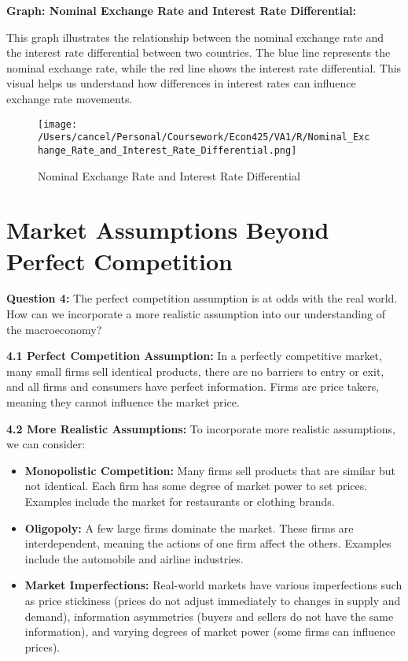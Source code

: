 \documentclass{article}
\begin{document}
\textbf{Graph: Nominal Exchange Rate and Interest Rate Differential:} 

This graph illustrates the relationship between the nominal exchange rate and the interest rate differential between two countries. The blue line represents the nominal exchange rate, while the red line shows the interest rate differential. This visual helps us understand how differences in interest rates can influence exchange rate movements.

\begin{figure}[h!]
    \centering
    \texttt{[image: /Users/cancel/Personal/Coursework/Econ425/VA1/R/Nominal\_Exchange\_Rate\_and\_Interest\_Rate\_Differential.png]}
    \caption{Nominal Exchange Rate and Interest Rate Differential}
\end{figure}

\hrulefill

\section{Market Assumptions Beyond Perfect Competition}

\textbf{Question 4:} The perfect competition assumption is at odds with the real world. How can we incorporate a more realistic assumption into our understanding of the macroeconomy?

\textbf{4.1 Perfect Competition Assumption:} In a perfectly competitive market, many small firms sell identical products, there are no barriers to entry or exit, and all firms and consumers have perfect information. Firms are price takers, meaning they cannot influence the market price.

\textbf{4.2 More Realistic Assumptions:} To incorporate more realistic assumptions, we can consider:

\begin{itemize}
    \item \textbf{Monopolistic Competition:} Many firms sell products that are similar but not identical. Each firm has some degree of market power to set prices. Examples include the market for restaurants or clothing brands.
    \item \textbf{Oligopoly:} A few large firms dominate the market. These firms are interdependent, meaning the actions of one firm affect the others. Examples include the automobile and airline industries.
    \item \textbf{Market Imperfections:} Real-world markets have various imperfections such as price stickiness (prices do not adjust immediately to changes in supply and demand), information asymmetries (buyers and sellers do not have the same information), and varying degrees of market power (some firms can influence prices).
\end{itemize}
\end{document}
